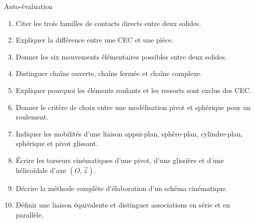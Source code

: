 \begin{TLExercise}{Auto-évaluation}
\begin{enumerate}
  \item Citer les trois familles de contacts directs entre deux solides.
  \item Expliquer la différence entre une CEC et une pièce.
  \item Donner les six mouvements élémentaires possibles entre deux solides.
  \item Distinguer chaîne ouverte, chaîne fermée et chaîne complexe.
  \item Expliquer pourquoi les éléments roulants et les ressorts sont exclus des CEC.
  \item Donner le critère de choix entre une modélisation pivot et sphérique pour
  un roulement.
  \item Indiquer les mobilités d'une liaison appui-plan, sphère-plan,
  cylindre-plan, sphérique et pivot glissant.
  \item Écrire les torseurs cinématiques d'une pivot, d'une glissière et d'une
  hélicoïdale d'axe \((O,\vec z)\).
  \item Décrire la méthode complète d'élaboration d'un schéma cinématique.
  \item Définir une liaison équivalente et distinguer associations en série et en parallèle.
\end{enumerate}
\end{TLExercise}
